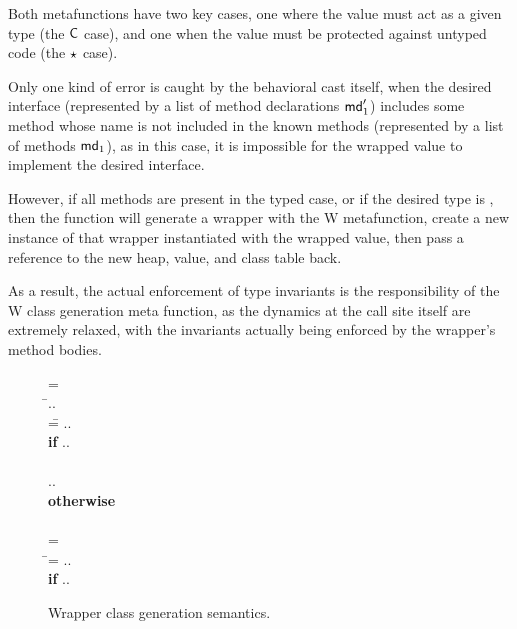 \documentclass[USenglish]{tex/lipics-v2016}
\begin{document}
Both metafunctions have two key cases, one where the value must act as a given
type (the $\C$ case), and one when the value must be protected against untyped
code (the $\star$ case). 

Only one kind of error is caught by the behavioral cast itself, when the desired
interface (represented by a list of method declarations $\mdp[1]$) includes some
method whose name is not included in the known methods (represented by a list of
methods $\md[1]$), as in this case, it is impossible for the wrapped value to 
implement the desired interface.

However, if all methods are present in the typed case, or if the desired type
is \any, then the function will generate a wrapper with the W metafunction, 
create a new instance of that wrapper instantiated with the wrapped value,
then pass a reference to the new heap, value, and class table back. 

As a result, the actual enforcement of type invariants is the responsibility
of the W class generation meta function, as the dynamics at the call site
itself are extremely relaxed, with the invariants actually being enforced by
the wrapper's method bodies. 
\begin{figure}[!h]
	\hrulefill
	\small
\begin{tabbing}\small
  \wrap{}\D = \\
  \HS\HS\WHERE\HS\= \Mdef\m\x{\t[1]}{\t[2]}\e\In\md[1].. \\
                 \> \mdpp[1] =\= \src{\Mdef\m\x{\tp[1]}{\tp[2]}{~\BehCast{\tp[2]}{\KCall{\FRead\that}\m{\bscast{\tp[1]}\x}{\t[1]}{\t[2]}}}} .. \\
\> \> \HS\HS \= \textbf{if} \HS \Mdef\m\x{\tp[1]}{\tp[2]}\ep\In\mdp[1].. \\
\\[-3mm]
\> \>  \src{\Mdef\m\x{\t[1]}{\t[2]}{~\KCall{\FRead\that}\m{\x}{\t[1]}{\t[2]}}} .. \\ \> \> \HS\HS \textbf{otherwise}
\\[6mm]\\[3mm]
   = \\
\HS\HS\WHERE\HS\=\mdp[1] = \src{ \Mdef\m\x{\any}{\any}{~\BehCast\any{ \KCall{\FRead\that} \m {\bscast{\t}\x}{\t}{\tp}} } }   ..
    \HS\HS\HS\HS \\ \> \> \HS\HS \= \textbf{if} \HS \Mdef\m\x{\t}{\tp}\e\In\md[1].. \\
\end{tabbing}

\vspace{-5mm}

\hrulefill
\vspace{-2mm}
\caption{Wrapper class generation semantics.}\label{w}\end{figure}
\end{document}

